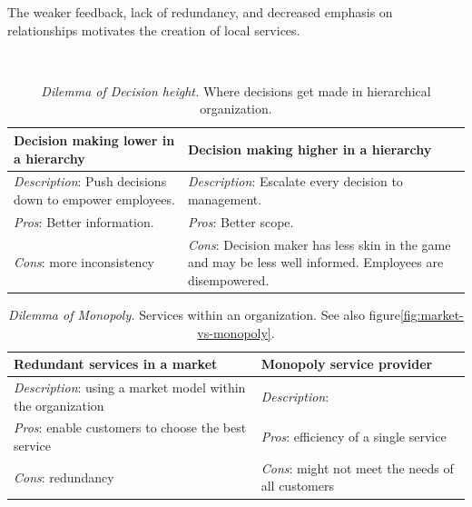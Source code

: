 The weaker feedback, lack of redundancy, and decreased emphasis on relationships motivates the creation of local services. 

\ \\

\begin{center}
\begin{table}[H] %
\begin{tabular}{ | m{\dilemmatablewidth}| m{\dilemmatablewidth} | } 
  \hline
  \textbf{Decision making lower in a hierarchy} &
  \textbf{Decision making higher in a hierarchy} \\
  \hline
  \textit{Description}: Push decisions down to empower employees. &
  \textit{Description}: Escalate every decision to management. \\  
  \hline
  \textit{Pros}: Better information. &
  \textit{Pros}: Better scope. \\
  \hline
  \textit{Cons}: more inconsistency & 
  \textit{Cons}: Decision maker has less skin in the game and may be less well informed. Employees are disempowered. \\
  \hline
\end{tabular}
\caption{
\textit{Dilemma of Decision height.}
Where decisions get made in hierarchical organization.
}
\label{table:decisions-low-vs-high}
\end{table}
\end{center}



\begin{center}
\begin{table}[H] %
\begin{tabular}{ | m{\dilemmatablewidth}| m{\dilemmatablewidth} | } 
  \hline
  \textbf{Redundant services in a market} &
  \textbf{Monopoly service provider} \\
  \hline
  \textit{Description}: using a market model within the organization &
  \textit{Description}:  \\  
  \hline
  \textit{Pros}: enable customers to choose the best service &
  \textit{Pros}: efficiency of a single service \\
  \hline
  \textit{Cons}: redundancy & 
  \textit{Cons}: might not meet the needs of all customers \\
  \hline
\end{tabular}
\caption{
\textit{Dilemma of Monopoly.}
Services within an organization. See also figure\ref{fig:market-vs-monopoly}.
}
\label{table:market-vs-monopoly}
\end{table}
\end{center}


